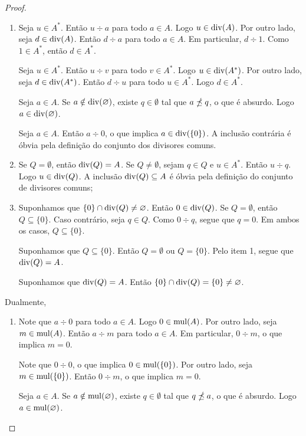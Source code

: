 \begin{proof}
	\begin{enumerate}
	\item Seja $u \in A^*$. Então $u \div a$ para todo $a \in A$. Logo $u \in \operatorname{div}(A)$. Por outro lado, seja $d \in \operatorname{div}(A)$. Então $d \div a$ para todo $a \in A$. Em particular, $d \div 1$. Como $1 \in A^*$, então $d \in A^*$.

	Seja $u \in A^*$. Então $u \div v$ para todo $v \in A^*$. Logo $u \in \operatorname{div}(A^*)$. Por outro lado, seja $d \in \operatorname{div}(A^*)$. Então $d \div u$ para todo $u \in A^*$. Logo $d \in A^*$.

	Seja $a \in A$. Se $a \notin \operatorname{div}(\varnothing)$, existe $q \in \emptyset$ tal que $a \npreceq q$, o que é absurdo. Logo $a \in \operatorname{div}(\varnothing)$.

	Seja $a \in A$. Então $a \div 0$, o que implica $a \in \operatorname{div}(\{0\})$. A inclusão contrária é óbvia pela definição do conjunto dos divisores comuns.

	\item Se $Q = \emptyset$, então $\operatorname{div}(Q) = A$. Se $Q \neq \emptyset$, sejam $q \in Q$ e $u \in A^*$. Então $u \div q$. Logo $u \in \operatorname{div}(Q)$. A inclusão $\operatorname{div}(Q) \subseteq A$ é óbvia pela definição do conjunto de divisores comuns;

	\item Suponhamos que $\{0\} \cap \operatorname{div}(Q) \neq \varnothing$. Então $0 \in \operatorname{div}(Q)$. Se $Q = \emptyset$, então $Q \subseteq \{0\}$. Caso contrário, seja $q \in Q$. Como $0 \div q$, segue que $q=0$. Em ambos os casos, $Q \subseteq \{0\}$.

	Suponhamos que $Q \subseteq \{0\}$. Então $Q=\emptyset$ ou $Q=\{0\}$. Pelo item 1, segue que $\operatorname{div}(Q)=A$.

	Suponhamos que $\operatorname{div}(Q)=A$. Então $\{0\} \cap \operatorname{div}(Q) = \{0\} \neq \varnothing$.
	\end{enumerate}

Dualmente,
	\begin{enumerate}
	\item Note que $a \div 0$ para todo $a \in A$. Logo $0 \in \operatorname{mul}(A)$. Por outro  lado, seja $m \in \operatorname{mul}(A)$. Então $a \div m$ para todo $a \in A$. Em particular, $0 \div m$, o que implica $m=0$.

	Note que $0 \div 0$, o que implica $0 \in \operatorname{mul}(\{0\})$. Por outro lado, seja $m \in \operatorname{mul}(\{0\})$. Então $0 \div m$, o que implica $m=0$.

	Seja $a \in A$. Se $a \notin \operatorname{mul}(\varnothing)$, existe $q \in \emptyset$ tal que $q \npreceq a$, o que é absurdo. Logo $a \in \operatorname{mul}(\varnothing)$.


\end{enumerate}
\end{proof}
